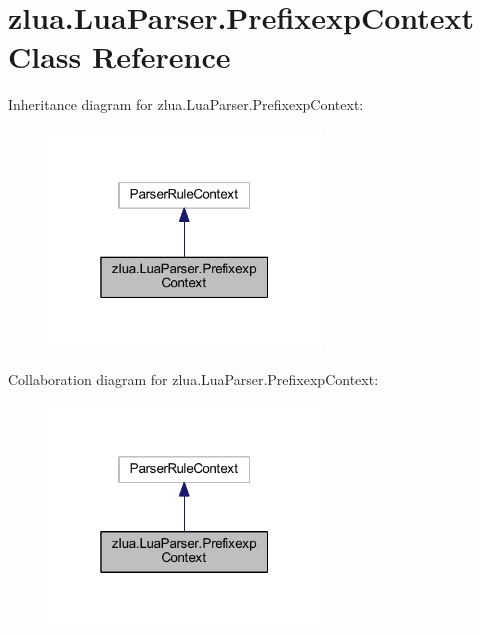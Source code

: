 \hypertarget{classzlua_1_1_lua_parser_1_1_prefixexp_context}{}\section{zlua.\+Lua\+Parser.\+Prefixexp\+Context Class Reference}
\label{classzlua_1_1_lua_parser_1_1_prefixexp_context}


Inheritance diagram for zlua.\+Lua\+Parser.\+Prefixexp\+Context\+:
\nopagebreak
\begin{figure}[H]
\begin{center}
\leavevmode
\includegraphics[width=205pt]{classzlua_1_1_lua_parser_1_1_prefixexp_context__inherit__graph}
\end{center}
\end{figure}


Collaboration diagram for zlua.\+Lua\+Parser.\+Prefixexp\+Context\+:
\nopagebreak
\begin{figure}[H]
\begin{center}
\leavevmode
\includegraphics[width=205pt]{classzlua_1_1_lua_parser_1_1_prefixexp_context__coll__graph}
\end{center}
\end{figure}
